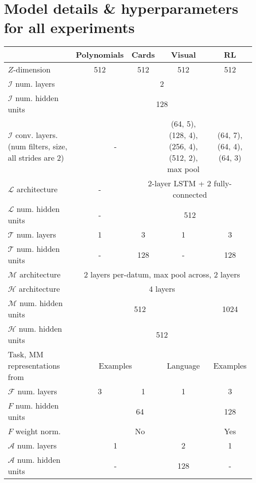 \chapter{Model details \& hyperparameters for all experiments} \label{appendix:model_hyperparameters}
\begin{table}
\scriptsize
\centering
\begin{tabular}{|p{3cm}||c|c|c|c|}
\hline
& Polynomials & Cards & Visual & RL \\\hline
\hline
$Z$-dimension & 512 & 512 & 512 & 512 \\\hline
$\mathcal{I}$ num. layers & \multicolumn{4}{c|}{2} \\\hline
$\mathcal{I}$ num. hidden units & \multicolumn{4}{c|}{128} \\\hline
$\mathcal{I}$ conv. layers. (num filters, size, all strides are 2) & \multicolumn{2}{c|}{-} & \multicolumn{1}{p{2.3cm}|}{(64, 5), (128, 4), (256, 4), (512, 2), max pool} & \multicolumn{1}{p{2.3cm}|}{(64, 7), (64, 4), (64, 3)}\\\hline
$\mathcal{L}$ architecture & -  & \multicolumn{3}{c|}{2-layer LSTM + 2 fully-connected} \\\hline
$\mathcal{L}$ num. hidden units & -  & \multicolumn{3}{c|}{512} \\\hline
$\mathcal{T}$ num. layers & 1 & 3 & 1 & 3 \\\hline
$\mathcal{T}$ num. hidden units & - & 128 & - & 128 \\\hline
$\mathcal{M}$ architecture & \multicolumn{4}{c|}{2 layers per-datum, max pool across, 2 layers} \\\hline
$\mathcal{H}$ architecture & \multicolumn{4}{c|}{4 layers} \\\hline
$\mathcal{M}$ num. hidden units & \multicolumn{3}{c|}{512} & 1024 \\\hline
$\mathcal{H}$ num. hidden units & \multicolumn{4}{c|}{512} \\\hline
Task, MM representations from & \multicolumn{2}{c|}{Examples} & Language & Examples \\\hline
$\mathcal{F}$ num. layers & 3 & 1 & 1 & 3 \\\hline
$F$ num. hidden units & \multicolumn{3}{c|}{64} & 128 \\\hline
$F$ weight norm. \citep{Salimans2016} & \multicolumn{3}{c|}{No} & Yes \\\hline
$\mathcal{A}$ num. layers & \multicolumn{2}{c|}{1} & 2 & 1 \\\hline
$\mathcal{A}$ num. hidden units & \multicolumn{2}{c|}{-} & 128 & -  \\\hline

\end{tabular}
\end{table}
